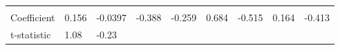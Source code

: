 \documentclass[
]{book}
\begin{document}
\begin{longtable}[]{@{}lllllllll@{}}
\begin{minipage}[t]{0.06\columnwidth}
\strut
\end{minipage} & \begin{minipage}[t]{0.11\columnwidth}\raggedright
\strut
\end{minipage} & \begin{minipage}[t]{0.07\columnwidth}\raggedright
\strut
\end{minipage} & \begin{minipage}[t]{0.07\columnwidth}\raggedright
\strut
\end{minipage} & \begin{minipage}[t]{0.10\columnwidth}\raggedright
\strut
\end{minipage}\tabularnewline
\begin{minipage}[t]{0.10\columnwidth}\raggedright
Coefficient\strut
\end{minipage} & \begin{minipage}[t]{0.08\columnwidth}\raggedright
0.156\strut
\end{minipage} & \begin{minipage}[t]{0.09\columnwidth}\raggedright
-0.0397\strut
\end{minipage} & \begin{minipage}[t]{0.07\columnwidth}\raggedright
-0.388\strut
\end{minipage} & \begin{minipage}[t]{0.06\columnwidth}\raggedright
-0.259\strut
\end{minipage} & \begin{minipage}[t]{0.11\columnwidth}\raggedright
0.684\strut
\end{minipage} & \begin{minipage}[t]{0.07\columnwidth}\raggedright
-0.515\strut
\end{minipage} & \begin{minipage}[t]{0.07\columnwidth}\raggedright
0.164\strut
\end{minipage} & \begin{minipage}[t]{0.10\columnwidth}\raggedright
-0.413\strut
\end{minipage}\tabularnewline
\begin{minipage}[t]{0.10\columnwidth}\raggedright
t-statistic\strut
\end{minipage} & \begin{minipage}[t]{0.08\columnwidth}\raggedright
1.08\strut
\end{minipage} & \begin{minipage}[t]{0.09\columnwidth}\raggedright
-0.23\strut
\end{minipage} & \begin{minipage}[t]{0.07\columnwidth}\raggedright

\end{minipage}
\end{longtable}
\end{document}
